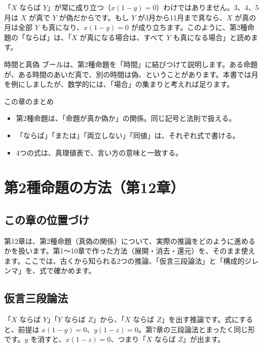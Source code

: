 \documentclass[a4paper,11pt,openany]{ltjsbook}
\begin{document}
「$X$ ならば $Y$」が常に成り立つ（$x(1-y)=0$）わけではありません。3、4、5月は $X$ が真で $Y$ が偽だからです。もし $Y$ が3月から11月まで真なら、$X$ が真の月は全部 $Y$ も真になり、$x(1-y)=0$ が成り立ちます。このように、第2種命題の「ならば」は、「$X$ が真になる場合は、すべて $Y$ も真になる場合」と読めます。

\begin{notebox}{時間と真偽}
ブールは、第2種命題を「時間」に結びつけて説明します。ある命題が、ある時間のあいだ真で、別の時間は偽、ということがあります。本書では月を例にしましたが、数学的には、「場合」の集まりと考えれば足ります。
\end{notebox}

\begin{pointbox}{この章のまとめ}
\begin{itemize}[leftmargin=*]
\item 第2種命題は、「命題が真か偽か」の関係。同じ記号と法則で扱える。
\item 「ならば」「または」「両立しない」「同値」は、それぞれ式で書ける。
\item 4つの式は、真理値表で、言い方の意味と一致する。
\end{itemize}
\end{pointbox}

\chapter{第2種命題の方法（第12章）}

\section{この章の位置づけ}

第12章は、第2種命題（真偽の関係）について、実際の推論をどのように進めるかを扱います。第1〜10章で作った方法（展開・消去・還元）を、そのまま使えます。ここでは、古くから知られる2つの推論、「仮言三段論法」と「構成的ジレンマ」を、式で確かめます。

\section{仮言三段論法}

「$X$ ならば $Y$」「$Y$ ならば $Z$」から、「$X$ ならば $Z$」を出す推論です。式にすると、前提は $x(1-y)=0$、$y(1-z)=0$。第7章の三段論法とまったく同じ形です。$y$ を消すと、$x(1-z)=0$、つまり「$X$ ならば $Z$」が出ます。
\end{document}
